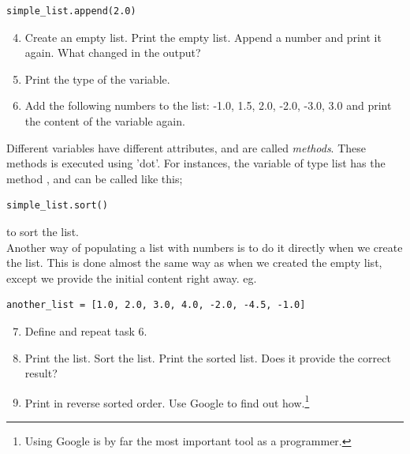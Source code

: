 \documentclass{article}
\begin{document}
\begin{lstlisting}
simple_list.append(2.0)
\end{lstlisting}

\begin{enumerate}
  \setcounter{enumi}{3}
  \item Create an empty list.
    Print the empty list.
    Append a number and print it again.
    What changed in the output?

  \item Print the type of the variable.

  \item Add the following numbers to the list: -1.0, 1.5, 2.0, -2.0, -3.0, 3.0 and
    print the content of the variable again.
\end{enumerate}


Different variables have different attributes, and are called {\em methods}.
These methods is executed using 'dot'.
For instances,
the variable of type list has the method ,
and can be called like this;

\begin{lstlisting}
simple_list.sort()
\end{lstlisting}

to sort the list.\\

Another way of populating a list with numbers is to do it directly when
we create the list.
This is done almost the same way as when we created the empty list, except we
provide the initial content right away. eg.

\begin{lstlisting}
another_list = [1.0, 2.0, 3.0, 4.0, -2.0, -4.5, -1.0]
\end{lstlisting}


\begin{enumerate}
  \setcounter{enumi}{6}
  \item Define  and repeat task 6.

  \item Print the list. Sort the list. Print the sorted list.
  Does it provide the correct result?

  \item Print  in reverse sorted order.
    Use Google to find out how.\footnote{Using Google is
    by far the most important tool as a programmer.}
\end{enumerate}

\end{document}
